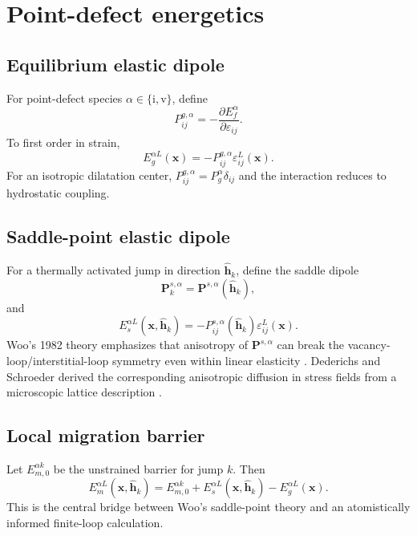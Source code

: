 \documentclass[11pt]{article}
\newcommand{\ii}{\mathrm i}
\newcommand{\vv}{\mathrm v}
\newcommand{\bP}{\bm{P}}
\newcommand{\bx}{\bm{x}}
\newcommand{\bh}{\bm{h}}
\begin{document}
\section{Point-defect energetics}
\subsection{Equilibrium elastic dipole}
For point-defect species $\alpha\in\{\ii,\vv\}$, define
\begin{equation}
P_{ij}^{g,\alpha}=-\frac{\partial E_f^\alpha}{\partial\varepsilon_{ij}}.
\end{equation}
To first order in strain,
\begin{equation}
\boxed{E_g^{\alpha L}(\bx)=-P_{ij}^{g,\alpha}\varepsilon_{ij}^{L}(\bx)}.
\end{equation}
For an isotropic dilatation center, $P_{ij}^{g,\alpha}=P_g^\alpha\delta_{ij}$ and the interaction reduces to hydrostatic coupling.

\subsection{Saddle-point elastic dipole}
For a thermally activated jump in direction $\hat{\bh}_k$, define the saddle dipole
\begin{equation}
\bP_k^{s,\alpha}=\bP^{s,\alpha}(\hat{\bh}_k),
\end{equation}
and
\begin{equation}
\boxed{E_s^{\alpha L}(\bx,\hat{\bh}_k)=-P_{ij}^{s,\alpha}(\hat{\bh}_k)\varepsilon_{ij}^{L}(\bx)}.
\end{equation}
Woo's 1982 theory emphasizes that anisotropy of $\bP^{s,\alpha}$ can break the vacancy-loop/interstitial-loop symmetry even within linear elasticity \cite{Woo1982}. Dederichs and Schroeder derived the corresponding anisotropic diffusion in stress fields from a microscopic lattice description \cite{DederichsSchroeder1978}.

\subsection{Local migration barrier}
Let $E_{m,0}^{\alpha k}$ be the unstrained barrier for jump $k$. Then
\begin{equation}
\boxed{E_m^{\alpha L}(\bx,\hat{\bh}_k)=E_{m,0}^{\alpha k}+E_s^{\alpha L}(\bx,\hat{\bh}_k)-E_g^{\alpha L}(\bx)}.
\end{equation}
This is the central bridge between Woo's saddle-point theory and an atomistically informed finite-loop calculation.
\end{document}
